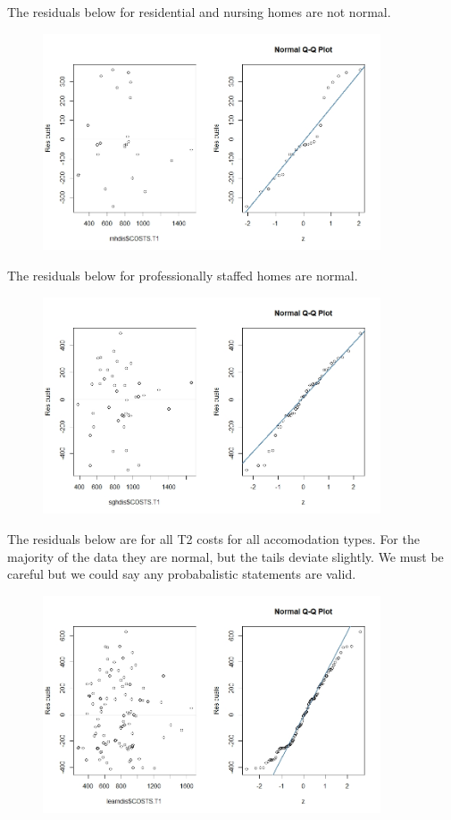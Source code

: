 \documentclass[]{article}
\begin{document}
The residuals below for residential and nursing homes are not normal.
\begin{figure}[H]
\centering
\includegraphics[width=10cm]{RStudio/jpeg/Res_RNH.jpeg}
\end{figure}
The residuals below for professionally staffed homes are normal.
\begin{figure}[H]
\centering
\includegraphics[width=10cm]{RStudio/jpeg/Res_SGH.jpeg}
\end{figure}
\newpage
The residuals below are for all T2 costs for all accomodation types. For the majority of the data they are normal, but the tails deviate slightly. We must be careful but we could say any probabalistic statements are valid.
\begin{figure}[H]
\centering
\includegraphics[width=10cm]{RStudio/jpeg/Res_COST.jpeg}
\end{figure}
\end{document}

